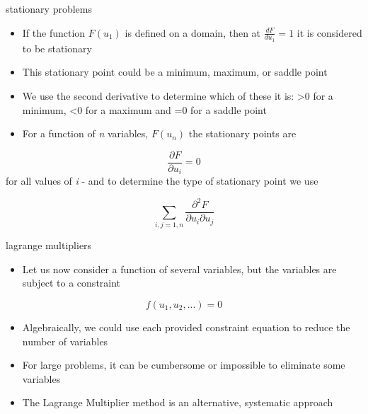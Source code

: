 \documentclass[
  letterpaper,
  ignorenonframetext,
  aspectratio=43,
  handout,
  12pt]{beamer}
\providecommand{\tightlist}{%
  \setlength{\itemsep}{0pt}\setlength{\parskip}{0pt}}
\providecommand{\tightlist}{%
\setlength{\itemsep}{0pt}\setlength{\parskip}{0pt}}
\begin{document}
\begin{frame}{stationary problems}
\protect\hypertarget{stationary-problems}{}
\begin{itemize}
\tightlist
\item
  If the function \(F(u_1)\) is defined on a domain, then at
  \(\frac{dF}{du_1}=1\) it is considered to be stationary
\item
  This stationary point could be a minimum, maximum, or saddle point
\item
  We use the second derivative to determine which of these it is:
  \textgreater0 for a minimum, \textless0 for a maximum and =0 for a
  saddle point
\item
  For a function of \emph{n} variables, \(F(u_n)\) the stationary points
  are
\end{itemize}

\[\frac{\partial F}{\partial u_i} = 0\] for all values of \emph{i} - and
to determine the type of stationary point we use

\[\sum_{i,j=1,n} \frac {\partial^2 F}{\partial u_i \partial u_j}\]
\end{frame}

\begin{frame}{lagrange multipliers}
\protect\hypertarget{lagrange-multipliers-1}{}
\begin{itemize}
\tightlist
\item
  Let us now consider a function of several variables, but the variables
  are subject to a constraint
\end{itemize}

\[ f(u_1, u_2, ... ) = 0\]

\begin{itemize}
\tightlist
\item
  Algebraically, we could use each provided constraint equation to
  reduce the number of variables
\item
  For large problems, it can be cumbersome or impossible to eliminate
  some variables
\item
  The Lagrange Multiplier method is an alternative, systematic approach
\end{itemize}
\end{frame}
\end{document}
